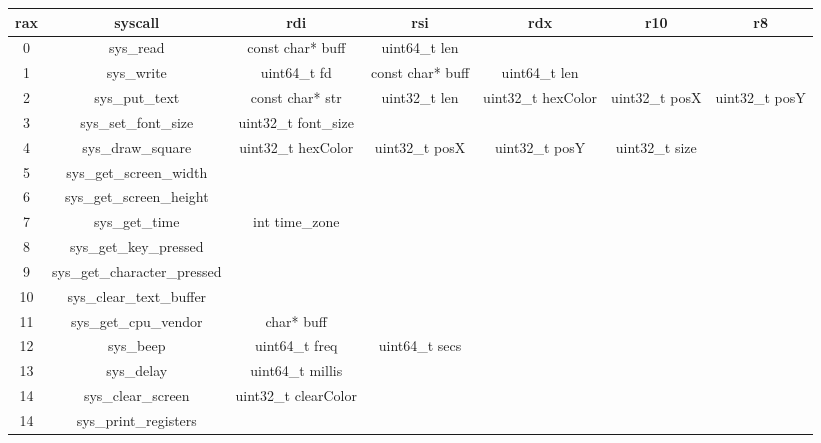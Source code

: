\documentclass{article}
\begin{document}
\begin{center}
\hspace*{-0.95in}
\begin{tabular}{|c|c|c|c|c|c|c|}
\hline
\textbf{rax} & \textbf{syscall} & \textbf{rdi} & \textbf{rsi} & \textbf{rdx} & \textbf{r10} & \textbf{r8} \\ \hline
0 & sys\_read &  const char* buff & uint64\_t len & & & \\ \hline
1 & sys\_write & uint64\_t fd & const char* buff & uint64\_t len & &  \\ \hline
2 & sys\_put\_text & const char* str & uint32\_t len & uint32\_t hexColor & uint32\_t posX & uint32\_t posY \\ \hline
3 & sys\_set\_font\_size & uint32\_t font\_size & & & &  \\ \hline
4 & sys\_draw\_square & uint32\_t hexColor & uint32\_t posX & uint32\_t posY & uint32\_t size &  \\ \hline
5 & sys\_get\_screen\_width & & & & & \\ \hline
6 & sys\_get\_screen\_height & & & & &   \\ \hline
7 & sys\_get\_time & int time\_zone & & & &   \\ \hline
8 & sys\_get\_key\_pressed & & & & &   \\ \hline
9 & sys\_get\_character\_pressed & & & & &   \\ \hline
10 & sys\_clear\_text\_buffer & & & & &   \\ \hline
11 & sys\_get\_cpu\_vendor & char* buff & & & &   \\ \hline
12 & sys\_beep & uint64\_t freq & uint64\_t secs & & &  \\ \hline
13 & sys\_delay & uint64\_t millis & & & &  \\ \hline
14 & sys\_clear\_screen & uint32\_t clearColor & & & &  \\ \hline
14 & sys\_print\_registers &  & & & &  \\ \hline
\end{tabular}
\label{table:syscalls}
\end{center}
\end{document}
